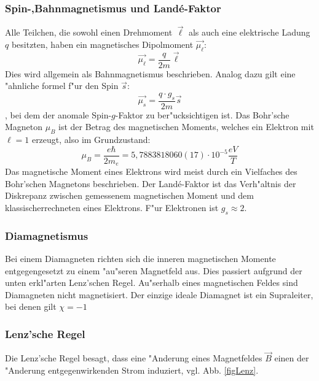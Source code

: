         \subsubsection*{Spin-,Bahnmagnetismus und Land\'e-Faktor}
            Alle Teilchen, die sowohl einen Drehmoment $\vec{\ell}$ als auch eine elektrische Ladung $q$ besitzten, haben ein magnetisches Dipolmoment $\vec{\mu_{\ell}}$:
            \begin{equation}
                \vec{\mu_{\ell}} = \frac{q}{2m} \vec{\ell}
            \end{equation}
            Dies wird allgemein als Bahnmagnetismus beschrieben. Analog dazu gilt eine "ahnliche formel f"ur den Spin $\vec{s}$:
            \begin{equation}
                \vec{\mu_s} = \frac{q\cdot g_s}{2m} \vec{s}
            \end{equation},
            bei dem der anomale Spin-$g$-Faktor zu ber"ucksichtigen ist.
            Das Bohr'sche Magneton $\mu_B$ ist der Betrag des magnetischen Moments, welches ein Elektron
            mit $\ell=1$ erzeugt, also im Grundzustand:
            \begin{equation}
                \mu_B = \frac{e \hbar}{2 m_e} = 5,7883818060(17)\cdot 10^{-5} \frac{eV}{T}
            \end{equation}
            Das magnetische Moment eines Elektrons wird meist durch ein Vielfaches des Bohr'schen
            Magnetons beschrieben.
            Der Land\'e-Faktor ist das Verh"altnis der Diskrepanz zwischen gemessenem magnetischen Moment
            und dem \dq klassisch\dq errechneten eines Elektrons. F"ur Elektronen ist $g_s \approx 2$.
        \subsubsection*{Diamagnetismus}
            Bei einem Diamagneten richten sich die inneren magnetischen Momente entgegengesetzt
            zu einem "au"seren Magnetfeld aus. Dies passiert aufgrund der unten erkl"arten Lenz'schen Regel.
            Au"serhalb eines magnetischen Feldes sind Diamagneten
            nicht magnetisiert. Der einzige ideale Diamagnet ist ein Supraleiter, bei denen gilt $\chi = -1$
        \subsubsection*{Lenz'sche Regel}
            Die Lenz'sche Regel besagt, dass eine "Anderung eines Magnetfeldes $\vec{B}$ einen der "Anderung
            entgegenwirkenden Strom induziert, vgl. Abb. \ref{figLenz}.

